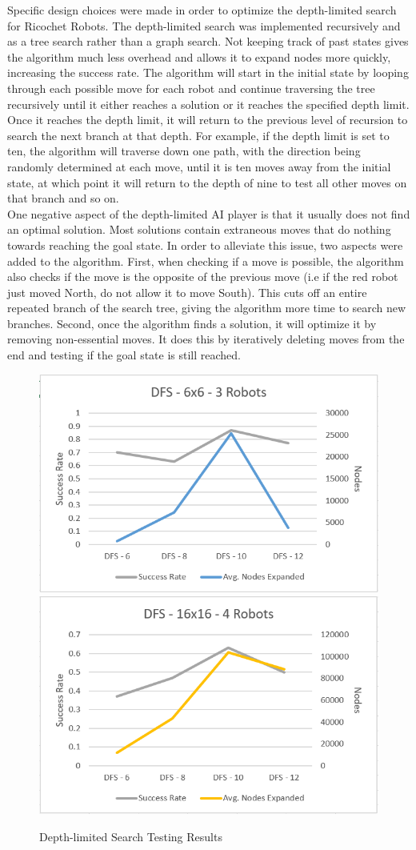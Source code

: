 \documentclass[a4paper,10pt]{article}
\begin{document}
  Specific design choices were made in order to optimize the depth-limited search for Ricochet Robots.  The depth-limited search was implemented recursively and as a tree search rather than a graph search.  Not keeping track of past states gives the algorithm much less overhead and allows it to expand nodes more quickly, increasing the success rate.  The algorithm will start in the initial state by looping through each possible move for each robot and continue traversing the tree recursively until it either reaches a solution or it reaches the specified depth limit.  Once it reaches the depth limit, it will return to the previous level of recursion to search the next branch at that depth. For example, if the depth limit is set to ten, the algorithm will traverse down one path, with the direction being randomly determined at each move, until it is ten moves away from the initial state, at which point it will return to the depth of nine to test all other moves on that branch and so on. \\
  One negative aspect of the depth-limited AI player is that it usually does not find an optimal solution.  Most solutions contain extraneous moves that do nothing towards reaching the goal state.  In order to alleviate this issue, two aspects were added to the algorithm.  First, when checking if a move is possible, the algorithm also checks if the move is the opposite of the previous move (i.e if the red robot just moved North, do not allow it to move South).  This cuts off an entire repeated branch of the search tree, giving the algorithm more time to search new branches.  Second, once the algorithm finds a solution, it will optimize it by removing non-essential moves.  It does this by iteratively deleting moves from the end and testing if the goal state is still reached. \\

  \begin{figure}[h!]
    \centering
   \includegraphics[width=0.45\linewidth]{figures/img1.PNG}
    \includegraphics[width=0.45\linewidth]{figures/img2.PNG}
    \caption{Depth-limited Search Testing Results}
    \label{fig:DFS_chart}
  \end{figure}
\end{document}
